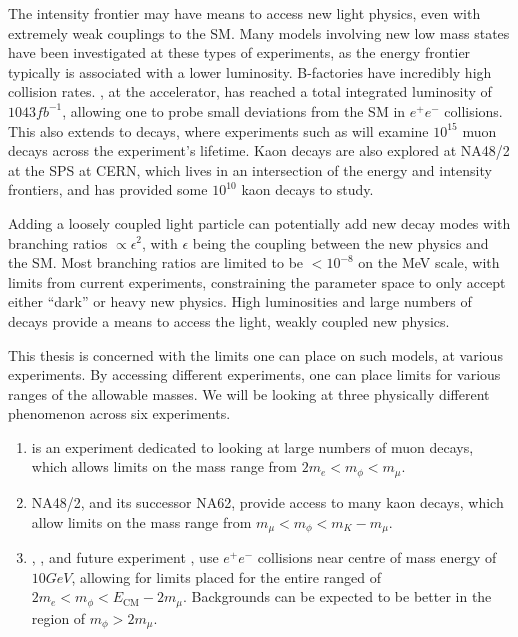 \label{chapter:experiments}

The intensity frontier may have means to access new light physics, even with extremely weak couplings to the SM.
Many models involving new low mass states have been investigated at these types of experiments, as the energy frontier typically is associated with a lower luminosity.
B-factories have incredibly high collision rates.
\belle, at the \kekb accelerator, has reached a total integrated luminosity of $1043fb^{-1}$, allowing one to probe small deviations from the SM in $e^+ e^-$ collisions.
This also extends to decays, where experiments such as \mueee will examine $10^{15}$ muon decays across the experiment's lifetime.
Kaon decays are also explored at NA48/2 at the SPS at CERN, which lives in an intersection of the energy and intensity frontiers, and has provided some $10^{10}$ kaon decays to study.

Adding a loosely coupled light particle can potentially add new decay modes with branching ratios $\propto \epsilon^2$, with $\epsilon$ being the coupling between the new physics and the SM.
Most branching ratios are limited to be $< 10^{-8}$ on the MeV scale, with limits from current experiments, constraining the parameter space to only accept either ``dark'' or heavy new physics.
High luminosities and large numbers of decays provide a means to access the light, weakly coupled new physics.

This thesis is concerned with the limits one can place on such models, at various experiments.
By accessing different experiments, one can place limits for various ranges of the allowable masses.
We will be looking at three physically different phenomenon across six experiments.
\begin{enumerate}
    \item \mueee is an experiment dedicated to looking at large numbers of muon decays, which allows limits on the mass range from $2 m_e < m_\phi < m_\mu$.
    \item NA48/2, and its successor NA62, provide access to many kaon decays, which allow limits on the mass range from $m_\mu < m_\phi < m_K - m_\mu$.
    \item \babar, \belle, and future experiment \belletwo, use $e^+ e^-$ collisions near centre of mass energy of $10GeV$, allowing for limits placed for the entire ranged of $2m_e < m_\phi < E_\textrm{CM} - 2 m_\mu$. Backgrounds can be expected to be better in the region of $m_\phi > 2 m_\mu$.
\end{enumerate}

